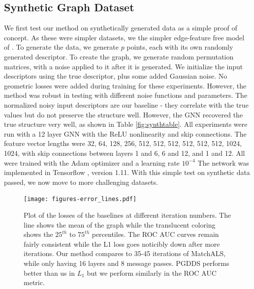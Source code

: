 \documentclass[10pt,twocolumn,letterpaper]{article}
\begin{document}
\subsection{Synthetic Graph Dataset}
We first test our method on synthetically generated data as a simple proof of concept.
As these were simpler datasets, we the simpler edge-feature free model of \cite{kipf2017semi}.
To generate the data, we generate $p$ points, each with its own randomly generated descriptor.
To create the graph, we generate random permutation matrices, with a noise applied to it after it is generated.
We initialize the input descriptors using the true descriptor, plus some added Gaussian noise.
No geometric losses were added during training for these experiments.
However, the method was robust in testing with different noise functions and parameters.
The normalized noisy input descriptors are our baseline - they correlate with the true values but do not preserve the structure well.
However, the GNN recovered the true structure very well, as shown in Table \ref{fig:synthtable}.
All experiments were run with a 12 layer GNN with the ReLU nonlinearity and skip connections.
The feature vector lengths were 32, 64, 128, 256, 512, 512, 512, 512, 512, 512, 1024, 1024, with skip connections between layers 1 and 6, 6 and 12, and 1 and 12.
All were trained with the Adam optimizer \cite{kingma2014adam} and a learning rate $10^{-4}$
The network was implemented in Tensorflow \cite{tensorflow2015}, version 1.11.
With this simple test on synthetic data passed, we now move to more challenging datasets.

\begin{figure}[t]
\begin{center}
  \texttt{[image: figures-error\_lines.pdf]}
  \end{center}
     \caption{
         Plot of the losses of the baselines at different iteration numbers.
         The line shows the mean of the graph while the translucent coloring shows the $25^{th}$ to $75^{th}$ percentiles.
         The ROC AUC curves remain fairly consistent while the L1 loss goes noticibly down after more iterations.
         Our method compares to 35-45 iterations of MatchALS, while only having 16 layers and 8 message passes.
         PGDDS performs better than us in $L_1$ but we perform similarly in the ROC AUC metric.
     }
  \label{fig:errorlines}
\end{figure}
\end{document}
